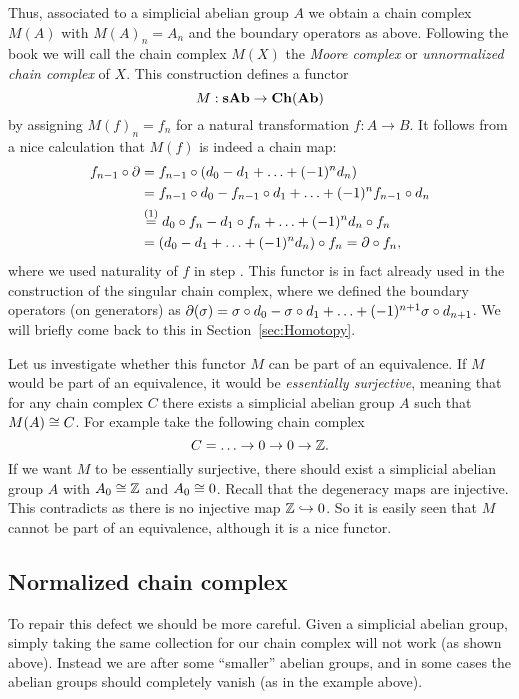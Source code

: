 Thus, associated to a simplicial abelian group $A$ we obtain a chain complex $M(A)$ with $M(A)_n = A_n$ and the boundary operators as above. Following the book \cite{goerss} we will call the chain complex $M(X)$ the \emph{Moore complex} or \emph{unnormalized chain complex} of $X$. This construction defines a functor
$$ M: \mathbf{sAb} \to \mathbf{Ch}(\mathbf{Ab}) $$
by assigning $M(f)_n = f_n$ for a natural transformation $f: A \to B$. It follows from a nice calculation that $M(f)$ is indeed a chain map:
\begin{align*}
	f_{n-1} \circ \partial &= f_{n-1} \circ (d_0 - d_1 + \ldots + (-1)^n d_n) \\
		&= f_{n-1} \circ d_0 - f_{n-1} \circ d_1 + \ldots + (-1)^n f_{n-1} \circ d_n \\
		&\stackrel{(1)}{=} d_0 \circ f_n - d_1 \circ f_n + \ldots + (-1)^n d_n \circ f_n \\
		&= (d_0 - d_1 + \ldots + (-1)^n d_n) \circ f_n = \partial \circ f_n,
\end{align*}
where we used naturality of $f$ in step . This functor is in fact already used in the construction of the singular chain complex, where we defined the boundary operators (on generators) as $\partial(\sigma) = \sigma \circ d_0 - \sigma \circ d_1 + \ldots + (-1)^{n+1} \sigma \circ d_{n+1}$. We will briefly come back to this in Section~\ref{sec:Homotopy}.

Let us investigate whether this functor $M$ can be part of an equivalence. If $M$ would be part of an equivalence, it would be \emph{essentially surjective}, meaning that for any chain complex $C$ there exists a simplicial abelian group $A$ such that $M(A) \cong C$. For example take the following chain complex
$$ C = \ldots \to 0 \to 0 \to \mathbb{Z}. $$
If we want $M$ to be essentially surjective, there should exist a simplicial abelian group $A$ with $A_0 \cong \mathbb{Z}$ and $A_0 \cong 0$. Recall that the degeneracy maps are injective. This contradicts as there is no injective map $\mathbb{Z} \hookrightarrow 0$. So it is easily seen that $M$ cannot be part of an equivalence, although it is a nice functor.


\subsection{Normalized chain complex}
To repair this defect we should be more careful. Given a simplicial abelian group, simply taking the same collection for our chain complex will not work (as shown above). Instead we are after some ``smaller'' abelian groups, and in some cases the abelian groups should completely vanish (as in the example above).

